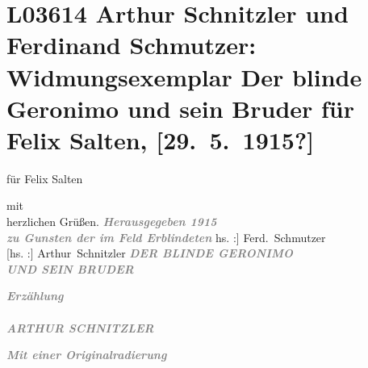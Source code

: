 

\section[Arthur Schnitzler und Ferdinand Schmutzer: Widmungsexemplar Der blinde Geronimo und sein Bruder für Felix Salten, {[}29. 5. 1915?{]}]{L03614 Arthur Schnitzler und Ferdinand Schmutzer: Widmungsexemplar Der blinde
               Geronimo und sein Bruder für Felix Salten, {[}29. 5. 1915?{]}}
\nopagebreak{}
\rehead{ }\normalsize\beginnumbering{}
\toendnotes[C]{\smallbreak\pagebreak[2]}
\toendnotes[C]{\smallbreak}
\pstart
           \noindent{}\centering{}{\pb}für Felix Salten\pend
           
\pstart
           \centering{}mit {\\}herzlichen Grüßen.\pend
           {\vspace{1\baselineskip}}
\pstart
           \centering{}\textcolor{gray}{\textbf{\emph{Herausgegeben 1915}}}{\\}\textcolor{gray}{\textbf{\emph{zu Gunsten der im Feld Erblindeten}}}\pend
           {\vspace{1\baselineskip}}
\pstart
           \centering{}{[}hs. :{]} \spacefill\mbox{Ferd. Schmutzer}{\\}{[}hs. :{]} \spacefill\mbox{Arthur Schnitzler}\pend
           \vspace{1em}{\vspace{1\baselineskip}}
\pstart
           \centering{}{\pb}\textcolor{gray}{\textbf{\emph{DER BLINDE GERONIMO {\\}UND SEIN
                           BRUDER}}}\pend
           
\pstart
           \centering{}\textcolor{gray}{\textbf{\emph{Erzählung}}}{\\}\textcolor{gray}{\textbf{}}{\\}\textcolor{gray}{\textbf{\emph{ARTHUR SCHNITZLER}}}\pend
           
\pstart
           \centering{}\textcolor{gray}{\textbf{\emph{Mit einer Originalradierung}}}\pend
           
